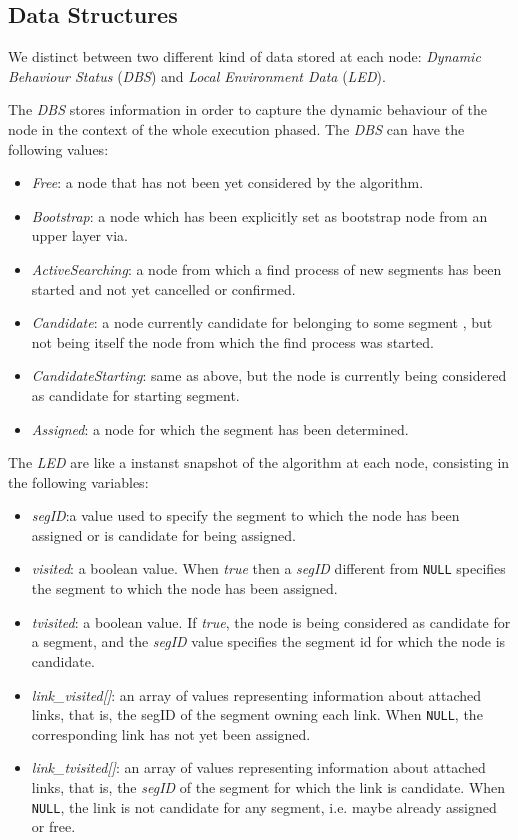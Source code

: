 \subsection{\disr{} Data Structures}
\label{ssec:disr_data}

We distinct between two different kind of data stored at each node:
\emph{Dynamic Behaviour Status} (\emph{DBS}) and \emph{Local
Environment Data} (\emph{LED}).

The \emph{DBS} stores information in order to capture the dynamic
behaviour of the node  in the context of the whole
\disr{} execution phased. The \emph{DBS} can have the following values:

\begin{itemize}
\item{\emph{Free}}: a node that has  not been yet considered  by the \disr{} algorithm.
\item{\emph{Bootstrap}}: a node which has been explicitly set as bootstrap node from
an upper layer via. 
\item{\emph{ActiveSearching}}: a node from which a find process of new segments has
been started and not yet cancelled or confirmed. 
\item{\emph{Candidate}}: a node currently candidate for belonging to some segment
, but not being itself the node from which the find process was started. 
\item{\emph{CandidateStarting}}: same as above, but the node is currently being considered as candidate
for starting segment. 
\item{\emph{Assigned}}: a node for which the segment has been determined.  
\end{itemize}

The \emph{LED} are like a instanst snapshot of the \disr{} algorithm at each node,
consisting in the following variables:
\begin{itemize}
\item{\emph{segID}}:a value used to specify the segment to which the
node has been assigned or is candidate for being assigned.
\item{\emph{visited}}: a boolean value. When \emph{true}
then a \emph{segID} different from \texttt{NULL} specifies the segment 
to which the node has been assigned. 
\item{\emph{tvisited}}: a boolean value. If \emph{true}, the node is
being considered as candidate for a segment, and the \emph{segID} value
specifies the segment id for which the node is candidate. 
\item{\emph{link\_visited[]}}: an array
of values representing information about attached links, that is, the
segID of the segment owning each link. When \texttt{NULL}, the corresponding link has not yet been
assigned.
\item{\emph{link\_tvisited[]}}: an array of
values representing information about attached links, that is, the \emph{segID} of
the segment for which the link is candidate. When \texttt{NULL}, the link is
not candidate for any segment, i.e. maybe already assigned
or free.
\end{itemize}

